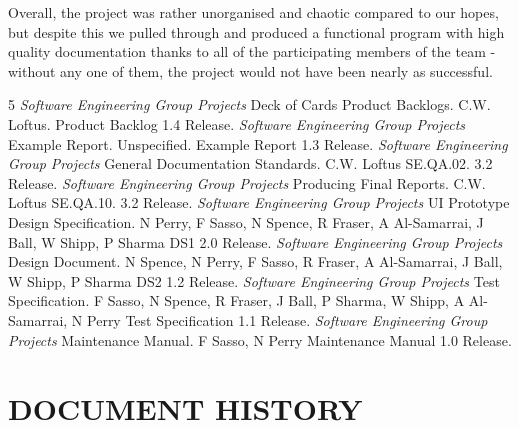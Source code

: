 \documentclass[a4paper]{project}
\begin{document}
		Overall, the project was rather unorganised and chaotic compared to our hopes, but despite this we pulled through and produced a functional program with high quality documentation thanks to all of the participating members of the team - without any one of them, the project would not have been nearly as successful.
	
	\clearpage
	
	
	\begin{thebibliography}{5}
		 \emph{Software Engineering Group Projects}
		Deck of Cards Product Backlogs.
		C.W. Loftus. Product Backlog 1.4 Release.
		 \emph{Software Engineering Group Projects}
		Example Report.
		Unspecified. Example Report 1.3 Release.
		 \emph{Software Engineering Group Projects}
		General Documentation Standards.
		C.W. Loftus SE.QA.02. 3.2 Release.
		 \emph{Software Engineering Group Projects}
		Producing Final Reports.
		C.W. Loftus SE.QA.10. 3.2 Release.
		 \emph{Software Engineering Group Projects}
		UI Prototype Design Specification.
		N Perry, F Sasso, N Spence, R Fraser, A Al-Samarrai, J Ball, W Shipp, P Sharma DS1 2.0 Release.
		 \emph{Software Engineering Group Projects}
		Design Document.
		N Spence, N Perry, F Sasso, R Fraser, A Al-Samarrai, J Ball, W Shipp, P Sharma DS2 1.2 Release.
		 \emph{Software Engineering Group Projects}
		Test Specification.
		F Sasso, N Spence, R Fraser, J Ball, P Sharma, W Shipp, A Al-Samarrai, N Perry Test Specification 1.1 Release.
		 \emph{Software Engineering Group Projects}
		Maintenance Manual.
		F Sasso, N Perry Maintenance Manual 1.0 Release.
	\end{thebibliography}
	
	\clearpage
	
	
	\section*{DOCUMENT HISTORY}
	
\end{document}
